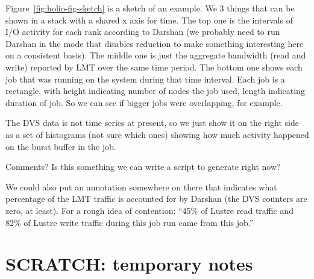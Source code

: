\documentclass[conference,10pt,compsocconf]{IEEEtran}
\begin{document}
Figure~\ref{fig:holio-fig-sketch} is a sketch of an example.  We 3 things
that can be shown in a stack with a shared x axis for time.  The top one is
the intervals of I/O activity for each rank according to Darshan (we probably
need to run Darshan in the mode that disables reduction to make something
interesting here on a consistent basis).  The middle one is just the
aggregate bandwidth (read and write) reported by LMT over the same time
period.  The bottom one shows each job that was running on the system during
that time interval.  Each job is a rectangle, with height indicating number
of nodes the job used, length indicating duration of job.  So we can see if
bigger jobs were overlapping, for example.

The DVS data is not time series at present, so we just show it on the right
side as a set of histograms (not sure which ones) showing how much activity
happened on the burst buffer in the job.

Comments?  Is this something we can write a script to generate right now?

We could also put an annotation somewhere on there that indicates what
percentage of the LMT traffic is accounted for by Darshan (the DVS counters
are zero, at least).  For a rough idea of contention: ``45\% of Lustre read
traffic and 82\% of Lustre write traffic during this job run came from this
job.''

\section{SCRATCH: temporary notes}
\end{document}

